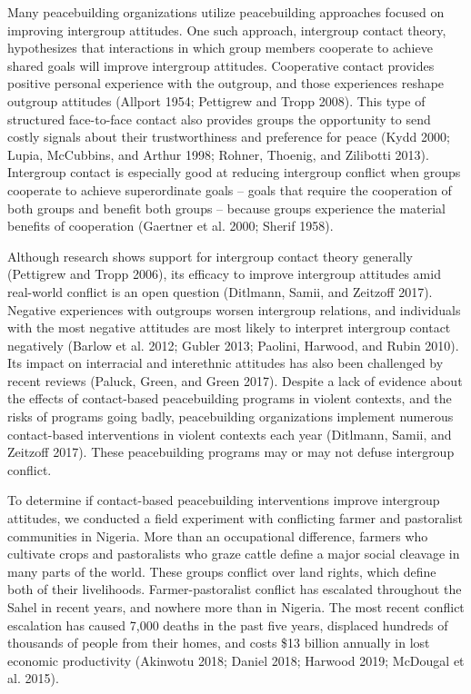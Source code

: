 \documentclass[11pt]{article}
\begin{document}
Many peacebuilding organizations utilize peacebuilding approaches
focused on improving intergroup attitudes. One such approach, intergroup
contact theory, hypothesizes that interactions in which group members
cooperate to achieve shared goals will improve intergroup attitudes.
Cooperative contact provides positive personal experience with the
outgroup, and those experiences reshape outgroup attitudes (Allport
1954; Pettigrew and Tropp 2008). This type of structured face-to-face
contact also provides groups the opportunity to send costly signals
about their trustworthiness and preference for peace (Kydd 2000; Lupia,
McCubbins, and Arthur 1998; Rohner, Thoenig, and Zilibotti 2013).
Intergroup contact is especially good at reducing intergroup conflict
when groups cooperate to achieve superordinate goals -- goals that
require the cooperation of both groups and benefit both groups --
because groups experience the material benefits of cooperation (Gaertner
et al. 2000; Sherif 1958).

Although research shows support for intergroup contact theory generally
(Pettigrew and Tropp 2006), its efficacy to improve intergroup attitudes
amid real-world conflict is an open question (Ditlmann, Samii, and
Zeitzoff 2017). Negative experiences with outgroups worsen intergroup
relations, and individuals with the most negative attitudes are most
likely to interpret intergroup contact negatively (Barlow et al. 2012;
Gubler 2013; Paolini, Harwood, and Rubin 2010). Its impact on
interracial and interethnic attitudes has also been challenged by recent
reviews (Paluck, Green, and Green 2017). Despite a lack of evidence
about the effects of contact-based peacebuilding programs in violent
contexts, and the risks of programs going badly, peacebuilding
organizations implement numerous contact-based interventions in violent
contexts each year (Ditlmann, Samii, and Zeitzoff 2017). These
peacebuilding programs may or may not defuse intergroup conflict.

To determine if contact-based peacebuilding interventions improve
intergroup attitudes, we conducted a field experiment with conflicting
farmer and pastoralist communities in Nigeria. More than an occupational
difference, farmers who cultivate crops and pastoralists who graze
cattle define a major social cleavage in many parts of the world. These
groups conflict over land rights, which define both of their
livelihoods. Farmer-pastoralist conflict has escalated throughout the
Sahel in recent years, and nowhere more than in Nigeria. The most recent
conflict escalation has caused 7,000 deaths in the past five years,
displaced hundreds of thousands of people from their homes, and costs
\$13 billion annually in lost economic productivity (Akinwotu 2018;
Daniel 2018; Harwood 2019; McDougal et al. 2015).
\end{document}
